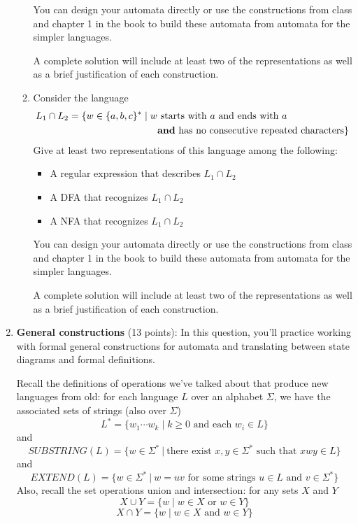 \begin{enumerate}[wide, labelwidth=!, labelindent=0pt]
\begin{enumerate}
You can design your automata directly or use the constructions from class and chapter 1 in the book to build these automata from automata for the simpler languages.
    
A complete solution will include at least two of the representations
as well as  a brief justification of each construction.


\item\gradeComplete Consider the language
    \begin{align*}
    L_1 \cap L_2 = \{w \in \{a,b,c\}^* \mid w &\text{ starts with $a$ and ends with $a$} \\
    &\text{{\bf and} has no consecutive repeated characters}\}
    \end{align*}
    Give at least two representations of this language among the following: 
    \begin{itemize}
    \item A regular expression that describes $L_1 \cap L_2$
    \item A DFA that recognizes $L_1 \cap L_2$
    \item A NFA that recognizes $L_1 \cap L_2$
    \end{itemize}
    You can design your automata directly or use the constructions from class and chapter 1 in the book to build these automata from automata for the simpler languages.
    
A complete solution will include at least two of the representations
as well as  a brief justification of each construction.

\end{enumerate}

\item\textbf{General constructions} (13 points):
In this question, you'll practice working with formal general constructions
for automata and translating between state diagrams and formal definitions.


Recall the definitions of operations we've talked about that produce
new languages from old: for each language $L$ over an alphabet $\Sigma$, 
we have the 
associated sets of strings (also over $\Sigma$)
\[
    L^* = \{ w_1 \cdots w_k \mid k \geq 0 \textrm{ and each } w_i \in L\}
\]
and
\[
    SUBSTRING(L) = \{ w \in \Sigma^* ~|~ \text{there exist } x,y \in \Sigma^* \text{ such that } xwy \in L\}
\]
and 
\[
    EXTEND(L) = \{ w \in \Sigma^* ~|~ w = uv \text{ for some strings } u \in L \text{ and } v \in \Sigma^* \}
\]
Also, recall the set operations union and intersection: for any sets $X$ and $Y$
\[
X \cup Y = \{ w \mid w \in X \text{ or } w \in Y \}
\]
\[
X \cap Y = \{ w \mid w \in X \text{ and } w \in Y \}
\]



\end{enumerate}
